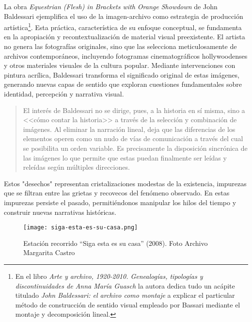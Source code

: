 La obra \textit{Equestrian (Flesh) in Brackets with Orange Showdown} de John Baldessari ejemplifica el uso de la imagen-archivo como estrategia de producción artística\footnote{En el libro \textit{Arte y archivo, 1920-2010. Genealogías, tipologías y discontinuidades de Anna María Guasch} la autora dedica tudo un acápite titulado \textit{John Baldessari: el archivo como montaje} a explicar el  particular método de construcción de sentido visual empleado por Bassari mediante el montaje y decomposición lineal.}. Esta práctica, característica de su enfoque conceptual, se fundamenta en la apropiación y recontextualización de material visual preexistente. El artista no genera las fotografías originales, sino que las selecciona meticulosamente de archivos contemporáneos, incluyendo fotogramas cinematográficos hollywoodenses y otros materiales visuales de la cultura popular. Mediante intervenciones con pintura acrílica, Baldessari transforma el significado original de estas imágenes, generando nuevas capas de sentido que exploran cuestiones fundamentales sobre identidad, percepción y narrativa visual.

\begin{quote}
    El interés de Baldessari no se dirige, pues, a la historia en sí misma, sino a <<cómo contar la historia>> a través de la selección y combinación de imágenes. Al eliminar la narración lineal, deja que las diferencias de los elementos operen como un nudo de vías de comunicación a través del cual se posibilita un orden variable. Es precisamente la disposición sincrónica de las imágenes lo que permite que estas puedan finalmente ser leídas y releídas según múltiples direcciones.\parencite[p. 113-114]{Guasch2011}
\end{quote}

Estos "desechos" representan cristalizaciones modestas de la existencia, impurezas que se filtran entre las grietas y recovecos del fenómeno observado. En estas impurezas persiste el pasado, permitiéndonos manipular los hilos del tiempo y construir nuevas narrativas históricas.

 
\begin{figure}[ht]
    \centering
    \texttt{[image: siga-esta-es-su-casa.png]}
    \caption{Estación recorrido ``Siga esta es su casa'' (2008). Foto Archivo Margarita Castro}
    \end{figure}
    
